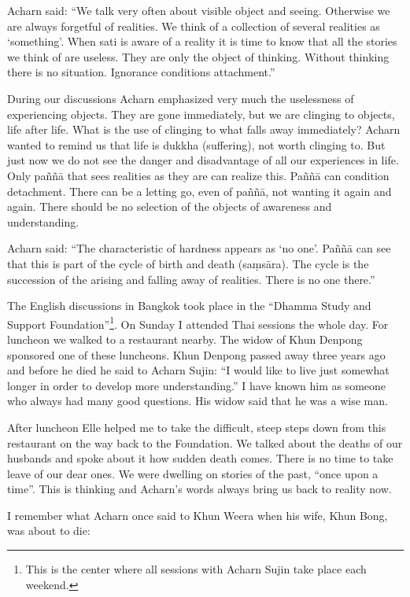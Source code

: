 Acharn said: ``We talk very often about visible object and seeing.
Otherwise we are always forgetful of realities. We think of a collection
of several realities as `something'. When sati is aware of a reality it
is time to know that all the stories we think of are useless. They are
only the object of thinking. Without thinking there is no situation.
Ignorance conditions attachment.''

During our discussions Acharn emphasized very much the uselessness of
experiencing objects. They are gone immediately, but we are clinging to
objects, life after life. What is the use of clinging to what falls away
immediately? Acharn wanted to remind us that life is dukkha (suffering),
not worth clinging to. But just now we do not see the danger and
disadvantage of all our experiences in life. Only paññā that sees
realities as they are can realize this. Paññā can condition detachment.
There can be a letting go, even of paññā, not wanting it again and
again. There should be no selection of the objects of awareness and
understanding.

Acharn said: ``The characteristic of hardness appears as `no one'. Paññā
can see that this is part of the cycle of birth and death (saṃsāra). The
cycle is the succession of the arising and falling away of realities.
There is no one there.''

The English discussions in Bangkok took place in the ``Dhamma Study and
Support Foundation''\footnote{This is the center where
all sessions with Acharn Sujin take place each weekend.}. On
Sunday I attended Thai sessions the whole day. For luncheon we walked to
a restaurant nearby. The widow of Khun Denpong sponsored one of these
luncheons. Khun Denpong passed away three years ago and before he died
he said to Acharn Sujin: ``I would like to live just somewhat longer in
order to develop more understanding.'' I have known him as someone who
always had many good questions. His widow said that he was a wise man.

After luncheon Elle helped me to take the difficult, steep steps down
from this restaurant on the way back to the Foundation. We talked about
the deaths of our husbands and spoke about it how sudden death comes.
There is no time to take leave of our dear ones. We were dwelling on
stories of the past, ``once upon a time''. This is thinking and Acharn's
words always bring us back to reality now.

I remember what Acharn once said to Khun Weera when his wife, Khun Bong,
was about to die:


